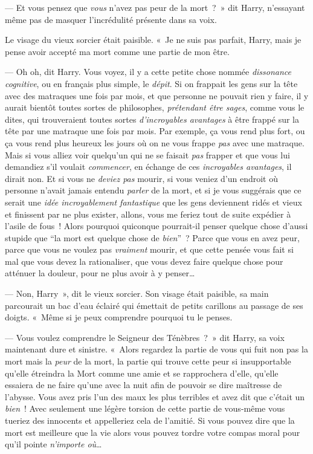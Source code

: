 --- Et vous pensez que \emph{vous} n'avez pas peur de la mort~?~»
dit Harry, n'essayant même pas de masquer l'incrédulité présente dans sa voix.

Le visage du vieux sorcier était paisible.
«~Je ne suis pas parfait, Harry, mais je pense avoir accepté ma mort comme une partie de mon être.

--- Oh oh, dit Harry.
Vous voyez, il y a cette petite chose nommée \emph{dissonance cognitive}, ou en français plus simple, le \emph{dépit}.
Si on frappait les gens sur la tête avec des matraques une fois par mois, et que personne ne pouvait rien y faire, il y aurait bientôt toutes sortes de philosophes, \emph{prétendant être sages}, comme vous le dites, qui trouveraient toutes sortes \emph{d'incroyables avantages} à être frappé sur la tête par une matraque une fois par mois.
Par exemple, ça vous rend plus fort, ou ça vous rend plus heureux les jours où on ne vous frappe \emph{pas} avec une matraque.
Mais si vous alliez voir quelqu'un qui ne se faisait \emph{pas} frapper et que vous lui demandiez s'il voulait \emph{commencer}, en échange de ces \emph{incroyables avantages}, il dirait non.
Et si vous ne \emph{deviez pas} mourir, si vous veniez d'un endroit où personne n'avait jamais entendu \emph{parler} de la mort, et si je vous suggérais que ce serait une \emph{idée incroyablement fantastique} que les gens deviennent ridés et vieux et finissent par ne plus exister, allons, vous me feriez tout de suite expédier à l'asile de fous~!
Alors pourquoi quiconque pourrait-il penser quelque chose d'aussi stupide que “la mort est quelque chose de \emph{bien}”~?
Parce que vous en avez peur, parce que vous ne voulez pas \emph{vraiment} mourir, et que cette pensée vous fait si mal que vous devez la rationaliser, que vous devez faire quelque chose pour atténuer la douleur, pour ne plus avoir à y penser…

--- Non, Harry~», dit le vieux sorcier.
Son visage était paisible, sa main parcourait un bac d'eau éclairé qui émettait de petits carillons au passage de ses doigts.
«~Même si je peux comprendre pourquoi tu le penses.

--- Vous voulez comprendre le Seigneur des Ténèbres~?~»
dit Harry, sa voix maintenant dure et sinistre.
«~Alors regardez la partie de vous qui fuit non pas la mort mais la \emph{peur} de la mort, la partie qui trouve cette peur si insupportable qu'elle étreindra la Mort comme une amie et se rapprochera d'elle, qu'elle essaiera de ne faire qu'une avec la nuit afin de pouvoir se dire maîtresse de l'abysse.
Vous avez pris l'un des maux les plus terribles et avez dit que c'était un \emph{bien}~!
Avec seulement une légère torsion de cette partie de vous-même vous tueriez des innocents et appelleriez cela de l'amitié.
Si vous pouvez dire que la mort est meilleure que la vie alors vous pouvez tordre votre compas moral pour qu'il pointe \emph{n'importe où}…

